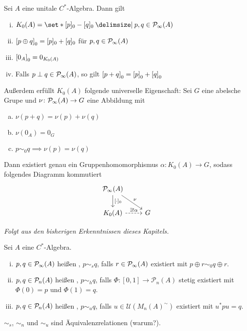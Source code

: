 \begin{proposition}[label=prop:66]
	Sei $A$ eine unitale $C^*$-Algebra.
	Dann gilt
	\begin{enumerate}[(i)]
		\item $K_0(A) = \set*{[p]_0 - [q]_0 \given p,q \in \Pinfty(A)}$
		\item $\benbrace*{p \oplus q}_0 = [p]_0 + [q]_0$ für $p,q \in \Pinfty(A)$
		\item $\benbrace*{0_A}_0 = 0_{K_0(A)}$
		\item Falls $p \perp q \in \Pinfty(A)$, so gilt $\benbrace*{p + q}_0 = \benbrace*{p}_0 + \benbrace*{q}_0$
	\end{enumerate}
	Außerdem erfüllt $K_0(A)$ folgende universelle Eigenschaft: Sei $G$ eine abelsche Grupe und $\nu \colon \Pinfty(A) \to G$ eine Abbildung mit
	\begin{enumerate}[a)]
		\item $\nu(p +q) = \nu(p) + \nu(q)$
		\item $\nu(0_A) = 0_G$
		\item $p \sim_0 q \implies \nu(p)=\nu(q)$
	\end{enumerate}
	Dann existiert genau ein Gruppenhomomorphismus $\alpha \colon K_0(A) \to G$, sodass folgendes Diagramm kommutiert
	\[
		\begin{tikzcd}
			\Pinfty(A) \dar["{[\cdot]_0}"] \drar["\nu"] &\\
			K_0(A) \rar[dashed,"\exists! \alpha"] & G
		\end{tikzcd}
	\]
\end{proposition}
\begin{beweis}
	\emph{Folgt aus den bisherigen Erkenntnissen dieses Kapitels.}
\end{beweis}

\begin{definition}[label=def67,{name=[{stabil äquivalent, homotop, unitär äquivalent}]}]
	Sei $A$ eine $C^*$-Algebra.
	\begin{enumerate}[(i)]
		\item $p,q \in \Pinfty(A)$ heißen , $p \sim_s q$, falls $r \in \Pinfty(A)$ existiert mit $p \oplus r \sim_0 q \oplus r$.
		\item $p,q \in \kernedP_n(A)$ heißen , $p \sim_h q$, falls $\Phi \colon [0,1] \to \mathcal{P}_n(A)$ stetig existiert mit $\Phi(0)=p$ und $\Phi(1)=q$. 
		\item $p,q \in \kernedP_n(A)$ heißen , $p \sim_u q$, falls $u \in \mathcal{U}(M_n(A)^\sim)$ existiert mit $u^* p u = q$.
	\end{enumerate}
	$\sim_s$, $\sim_n$ und $\sim_u$ sind Äquivalenzrelationen (warum?).
\end{definition}

